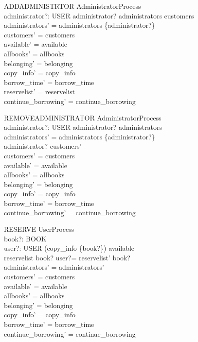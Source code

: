 \begin{schema}{ADDADMINISTRTOR}
  AdministratorProcess\\
  administrator?: USER
\where
  administrator? \notin  administrators \cup  customers\\
  administrators' = administrators \cup  \{administrator?\}\\
  customers' = customers\\
  available' = available\\
  allbooks' = allbooks\\
  belonging' = belonging\\
  copy\_info' = copy\_info\\
  borrow\_time' = borrow\_time\\
  reservelist' = reservelist\\
  continue\_borrowing' = continue\_borrowing
\end{schema}

\begin{schema}{REMOVEADMINISTRATOR}
  AdministratorProcess\\
  administrator?: USER
\where
  administrator? \notin  administrators\\
  administrators' = administrators \cup  \{administrator?\}\\
  administrator? \notin  customers'\\
  customers' = customers\\
  available' = available\\
  allbooks' = allbooks\\
  belonging' = belonging\\
  copy\_info' = copy\_info\\
  borrow\_time' = borrow\_time\\
  continue\_borrowing' = continue\_borrowing
\end{schema}

\begin{schema}{RESERVE}
  UserProcess\\
  book?: BOOK\\
  user?: USER
\where
  \lnot  \dom  (copy\_info \rres  \{book?\}) \subseteq  available\\
  reservelist book? \cup  \langle user?\rangle  = reservelist' book?\\
  administrators' = administrators'\\
  customers' = customers\\
  available' = available\\
  allbooks' = allbooks\\
  belonging' = belonging\\
  copy\_info' = copy\_info\\
  borrow\_time' = borrow\_time\\
  continue\_borrowing' = continue\_borrowing
\end{schema}

